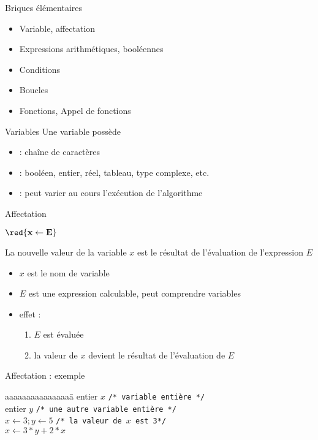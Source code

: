 \begin{frame}{Briques élémentaires}
  \begin{itemize}
  \item Variable, affectation
  \item Expressions arithmétiques, booléennes
  \item Conditions
  \item Boucles
  \item Fonctions, Appel de fonctions
  \end{itemize}
\end{frame}

 \begin{frame}{Variables}
    Une variable possède
    \begin{itemize}
    \item {} :  chaîne de caractères
    \item  {} : booléen, entier, réel, tableau, type complexe, etc.
    \item {} :  peut varier  au cours l’exécution de l’algorithme
    \end{itemize}
  \end{frame}

 \begin{frame}{Affectation}
   \begin{center}
     ${\red{\mathbf{x \leftarrow E}}}$
   \end{center}
   La nouvelle valeur de la variable $x$ est le résultat de l'évaluation de l'expression $E$
   \begin{itemize}
   \item $x$ est le nom de variable
   \item $E$ est une expression calculable, peut comprendre variables
   \item effet :
     \begin{enumerate}
     \item $E$ est évaluée
     \item la valeur de $x$ devient le résultat de l'évaluation de $E$
     \end{enumerate}
   \end{itemize}
 \end{frame}

 \begin{frame}{Affectation : exemple}
   \begin{tabbing}
     aaaaaaaaaaaaaaaa\=\kill
     entier $x$ \> \texttt{/* variable entière */} \\
     entier $y$ \> \texttt{/* une autre variable entière */} \\
     $x \leftarrow 3; y \leftarrow 5$ \> \texttt{/* la valeur de $x$ est 3*/} \\
     $x \leftarrow 3*y + 2*x$ \> 
   \end{tabbing}
 \end{frame}
 

